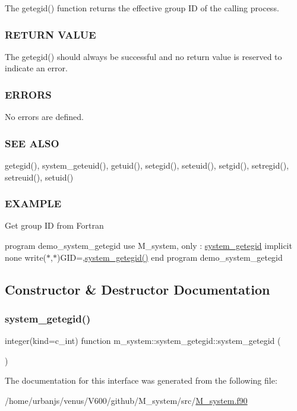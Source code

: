 The getegid() function returns the effective group ID of the calling process.

\subsubsection*{R\+E\+T\+U\+RN V\+A\+L\+UE}

The getegid() should always be successful and no return value is reserved to indicate an error.

\subsubsection*{E\+R\+R\+O\+RS}

No errors are defined.

\subsubsection*{S\+EE A\+L\+SO}

getegid(), system\+\_\+geteuid(), getuid(), setegid(), seteuid(), setgid(), setregid(), setreuid(), setuid()

\subsubsection*{E\+X\+A\+M\+P\+LE}

Get group ID from Fortran

program demo\+\_\+system\+\_\+getegid use M\+\_\+system, only \+: \mbox{\hyperlink{interfacem__system_1_1system__getegid}{system\+\_\+getegid}} implicit none write($\ast$,$\ast$)\textquotesingle{}G\+ID=\textquotesingle{},\mbox{\hyperlink{interfacem__system_1_1system__getegid_a35fcd8b85449dac6703e97290f193ee4}{system\+\_\+getegid()}} end program demo\+\_\+system\+\_\+getegid 

\subsection{Constructor \& Destructor Documentation}
\mbox{\label{interfacem__system_1_1system__getegid_a35fcd8b85449dac6703e97290f193ee4}} 
\subsubsection{\texorpdfstring{system\+\_\+getegid()}{system\_getegid()}}
{\footnotesize\ttfamily integer(kind=c\+\_\+int) function m\+\_\+system\+::system\+\_\+getegid\+::system\+\_\+getegid (\begin{DoxyParamCaption}{ }\end{DoxyParamCaption})\hspace{0.3cm}{\ttfamily [private]}}



The documentation for this interface was generated from the following file\+:\begin{DoxyCompactItemize}
\item 
/home/urbanjs/venus/\+V600/github/\+M\+\_\+system/src/\mbox{\hyperlink{M__system_8f90}{M\+\_\+system.\+f90}}\end{DoxyCompactItemize}
